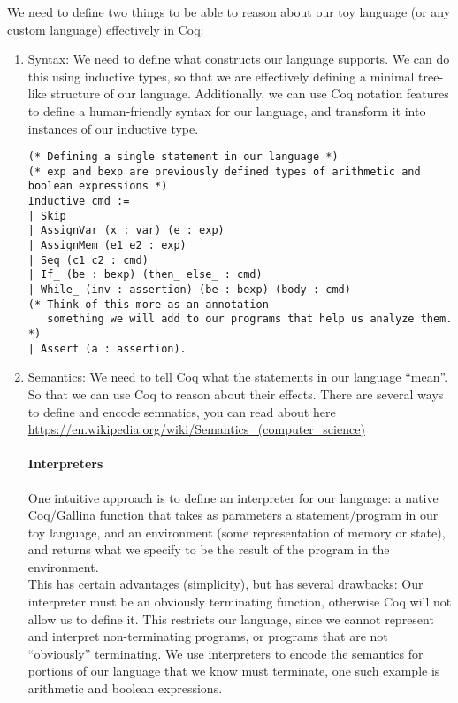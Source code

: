 \documentclass{article}
\begin{document}
We need to define two things to be able to reason about our toy language (or any custom language) effectively in Coq:
\begin{enumerate}
    \item Syntax: We need to define what constructs our language supports. We can do this using inductive types, so that we are effectively defining a minimal tree-like structure of our language. Additionally, we can use Coq notation features to define a human-friendly syntax for our language, and transform it into instances of our inductive type.
    
    \begin{verbatim}
(* Defining a single statement in our language *)
(* exp and bexp are previously defined types of arithmetic and boolean expressions *)
Inductive cmd :=
| Skip
| AssignVar (x : var) (e : exp)
| AssignMem (e1 e2 : exp)
| Seq (c1 c2 : cmd)
| If_ (be : bexp) (then_ else_ : cmd)
| While_ (inv : assertion) (be : bexp) (body : cmd)
(* Think of this more as an annotation
   something we will add to our programs that help us analyze them. *)
| Assert (a : assertion).
    \end{verbatim}
    
    \item Semantics: We need to tell Coq what the statements in our language ``mean''. So that we can use Coq to reason about their effects. There are several ways to define and encode semnatics, you can read about here \href{https://en.wikipedia.org/wiki/Semantics\_(computer\_science)}{https://en.wikipedia.org/wiki/Semantics\_(computer\_science)}
    
    \paragraph{Interpreters}
    One intuitive approach is to define an interpreter for our language: a native Coq/Gallina function that takes as parameters a statement/program in our toy language, and an environment (some representation of memory or state), and returns what we specify to be the result of the program in the environment. \\
    
    This has certain advantages (simplicity), but has several drawbacks: Our interpreter must be an obviously terminating function, otherwise Coq will not allow us to define it. This restricts our language, since we cannot represent and interpret non-terminating programs, or programs that are not ``obviously'' terminating. We use interpreters to encode the semantics for portions of our language that we know must terminate, one such example is arithmetic and boolean expressions.
    

\end{enumerate}
\end{document}
